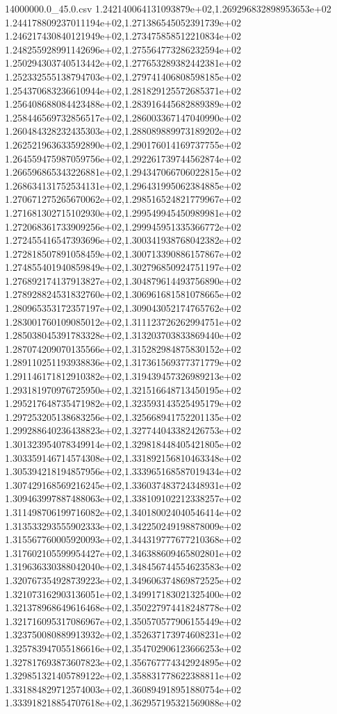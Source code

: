 \begin{filecontents*}{14000000.0_45.0.csv}
1.242140064131093879e+02,1.269296832898953653e+02
1.244178809237011194e+02,1.271386545052391739e+02
1.246217430840121949e+02,1.273475858512210834e+02
1.248255928991142696e+02,1.275564773286232594e+02
1.250294303740513442e+02,1.277653289382442381e+02
1.252332555138794703e+02,1.279741406808598185e+02
1.254370683236610944e+02,1.281829125572685371e+02
1.256408688084423488e+02,1.283916445682889389e+02
1.258446569732856517e+02,1.286003367147040990e+02
1.260484328232435303e+02,1.288089889973189202e+02
1.262521963633592890e+02,1.290176014169737755e+02
1.264559475987059756e+02,1.292261739744562874e+02
1.266596865343226881e+02,1.294347066706022815e+02
1.268634131752534131e+02,1.296431995062384885e+02
1.270671275265670062e+02,1.298516524821779967e+02
1.271681302715102930e+02,1.299549945450989981e+02
1.272068361733909256e+02,1.299945951335366772e+02
1.272455416547393696e+02,1.300341938768042382e+02
1.272818507891058459e+02,1.300713390886157867e+02
1.274855401940859849e+02,1.302796850924751197e+02
1.276892174137913827e+02,1.304879614493756890e+02
1.278928824531832760e+02,1.306961681581078665e+02
1.280965353172357197e+02,1.309043052174765762e+02
1.283001760109085012e+02,1.311123726262994751e+02
1.285038045391783328e+02,1.313203703833869440e+02
1.287074209070135566e+02,1.315282984875830152e+02
1.289110251193938836e+02,1.317361569377371779e+02
1.291146171812910382e+02,1.319439457326989213e+02
1.293181970976725950e+02,1.321516648713450195e+02
1.295217648735471982e+02,1.323593143525495179e+02
1.297253205138683256e+02,1.325668941752201135e+02
1.299288640236438823e+02,1.327744043382426753e+02
1.301323954078349914e+02,1.329818448405421805e+02
1.303359146714574308e+02,1.331892156810463348e+02
1.305394218194857956e+02,1.333965168587019434e+02
1.307429168569216245e+02,1.336037483724348931e+02
1.309463997887488063e+02,1.338109102212338257e+02
1.311498706199716082e+02,1.340180024040546414e+02
1.313533293555902333e+02,1.342250249198878009e+02
1.315567760005920093e+02,1.344319777677210368e+02
1.317602105599954427e+02,1.346388609465802801e+02
1.319636330388042040e+02,1.348456744554623583e+02
1.320767354928739223e+02,1.349606374869872525e+02
1.321073162903136051e+02,1.349917183021325400e+02
1.321378968649616468e+02,1.350227974418248778e+02
1.321716095317086967e+02,1.350570577906155449e+02
1.323750080889913932e+02,1.352637173974608231e+02
1.325783947055186616e+02,1.354702906123666253e+02
1.327817693873607823e+02,1.356767774342924895e+02
1.329851321405789122e+02,1.358831778622388811e+02
1.331884829712574003e+02,1.360894918951880754e+02
1.333918218854707618e+02,1.362957195321569088e+02

\end{filecontents*}

